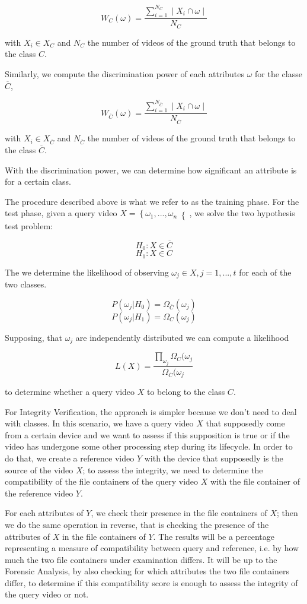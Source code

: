 $$  W_{C}(\omega) = \dfrac{\sum\limits_{i=1}^{N_{C}}\mid X_{i} \cap \omega \mid}{N_{C}} $$

with $X_{i} \in X_{C}$ and $N_{C}$ the number of videos of the ground truth that belongs to the class $C$.

Similarly, we compute the discrimination power of each attributes $\omega$ for the classe $\overline{C}$,

$$  W_{\overline{C}}(\omega) = \dfrac{\sum\limits_{i=1}^{N_{\overline{C}}}\mid X_{i} \cap \omega \mid}{N_{\overline{C}}} $$

with $X_{i} \in X_{\overline{C}}$ and $N_{\overline{C}}$ the number of videos of the ground truth that belongs to the class $\overline{C}$.

With the discrimination power, we can determine how significant an attribute is for a certain class.

The procedure described above is what we refer to as the training phase. For the test phase, given a query video $X = \left\lbrace \omega_{1},...,\omega_{n} \right\lbrace $, we solve the two hypothesis test problem:

$$  H_{0}:X \in \overline{C} $$
$$  H_{1}:X \in C $$

The we determine the likelihood of observing $\omega_{j} \in X, j = 1,...,t$ for each of the two classes.

$$ P(\omega_{j}\vert H_{0}) = \Omega_{\overline{C}}(\omega_{j}) $$
$$ P(\omega_{j}\vert H_{1}) = \Omega_{C}(\omega_{j}) $$ 

Supposing, that $\omega_{j}$ are independently distributed we can compute a likelihood

$$ L(X) = \dfrac{\prod\limits_{\omega_{j}} \Omega_{C}(\omega_{j} }{\Omega_{\overline{C}}(\omega_{j}} $$

to determine whether a query video $X$ to belong to the class $C$.

For Integrity Verification, the approach is simpler because we don't need to deal with classes. In this scenario, we have a query video $X$ that supposedly come from a certain device and we want to assess if this supposition is true or if the video has undergone some other processing step during its lifecycle. In order to do that, we create a reference video $Y$ with the device that supposedly is the source of the video $X$; to assess the integrity, we need to determine the compatibility of the file containers of the query video $X$ with the file container of the reference video $Y$. 

For each attributes of $Y$, we check their presence in the file containers of $X$; then we do the same operation in reverse, that is checking the presence of the attributes of $X$ in the file containers of $Y$. The results will be a percentage representing a measure of compatibility between query and reference, i.e. by how much the two file containers under examination differs. It will be up to the Forensic Analysis, by also checking for which attributes the two file containers differ, to determine if this compatibility score is enough to assess the integrity of the query video or not.


